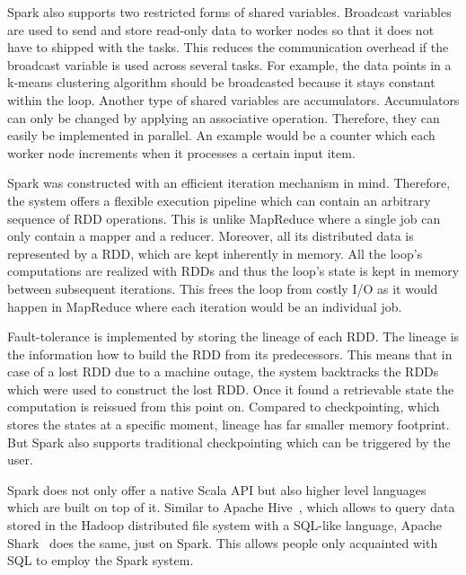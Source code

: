 Spark also supports two restricted forms of shared variables.
Broadcast variables are used to send and store read-only data to worker nodes so that it does not have to shipped with the tasks.
This reduces the communication overhead if the broadcast variable is used across several tasks.
For example, the data points in a k-means clustering algorithm should be broadcasted because it stays constant within the loop.
Another type of shared variables are accumulators.
Accumulators can only be changed by applying an associative operation.
Therefore, they can easily be implemented in parallel.
An example would be a counter which each worker node increments when it processes a certain input item.

Spark was constructed with an efficient iteration mechanism in mind.
Therefore, the system offers a flexible execution pipeline which can contain an arbitrary sequence of RDD operations.
This is unlike MapReduce where a single job can only contain a mapper and a reducer.
Moreover, all its distributed data is represented by a RDD, which are kept inherently in memory.
All the loop's computations are realized with RDDs and thus the loop's state is kept in memory between subsequent iterations.
This frees the loop from costly I/O as it would happen in MapReduce where each iteration would be an individual job.

Fault-tolerance is implemented by storing the lineage of each RDD.
The lineage is the information how to build the RDD from its predecessors.
This means that in case of a lost RDD due to a machine outage, the system backtracks the RDDs which were used to construct the lost RDD.
Once it found a retrievable state the computation is reissued from this point on.
Compared to checkpointing, which stores the states at a specific moment, lineage has far smaller memory footprint.
But Spark also supports traditional checkpointing which can be triggered by the user.

Spark does not only offer a native Scala API but also higher level languages which are built on top of it.
Similar to Apache Hive~\cite{hive}, which allows to query data stored in the Hadoop distributed file system with a SQL-like language, Apache Shark~\cite{xin:2013a} does the same, just on Spark.
This allows people only acquainted with SQL to employ the Spark system.


